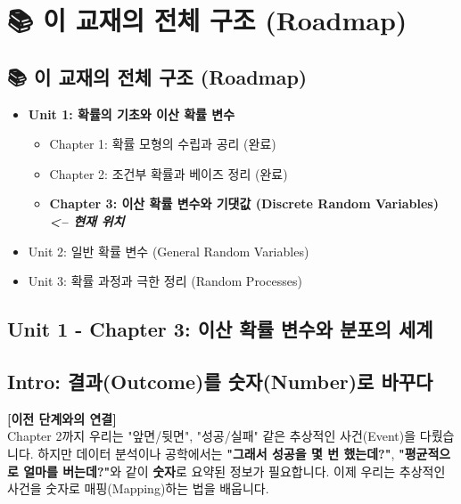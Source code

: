 \documentclass[11pt,a4paper]{book}
\newcommand{\chaptertitle}[2]{\section*{#1: #2}}
\theoremstyle{definition}
\begin{document}
\chapter{📚 이 교재의 전체 구조 (Roadmap)}
\label{ch:lecture3}



\section*{📚 이 교재의 전체 구조 (Roadmap)}
\begin{itemize}
    \item \textbf{Unit 1: 확률의 기초와 이산 확률 변수}
    \begin{itemize}
        \item Chapter 1: 확률 모형의 수립과 공리 (완료)
        \item Chapter 2: 조건부 확률과 베이즈 정리 (완료)
        \item[$\to$] \textbf{\textcolor{mainblue}{Chapter 3: 이산 확률 변수와 기댓값 (Discrete Random Variables) \textit{<-- 현재 위치}}}
    \end{itemize}
    \item Unit 2: 일반 확률 변수 (General Random Variables)
    \item Unit 3: 확률 과정과 극한 정리 (Random Processes)
\end{itemize}
\vspace{1cm}

\chaptertitle{Unit 1 - Chapter 3}{이산 확률 변수와 분포의 세계}

\section*{Intro: 결과(Outcome)를 숫자(Number)로 바꾸다}

\textbf{[이전 단계와의 연결]} \\
Chapter 2까지 우리는 "앞면/뒷면", "성공/실패" 같은 추상적인 사건(Event)을 다뤘습니다. 하지만 데이터 분석이나 공학에서는 \textbf{"그래서 성공을 몇 번 했는데?"}, \textbf{"평균적으로 얼마를 버는데?"}와 같이 \textbf{숫자}로 요약된 정보가 필요합니다. 이제 우리는 추상적인 사건을 숫자로 매핑(Mapping)하는 법을 배웁니다.
\end{document}
